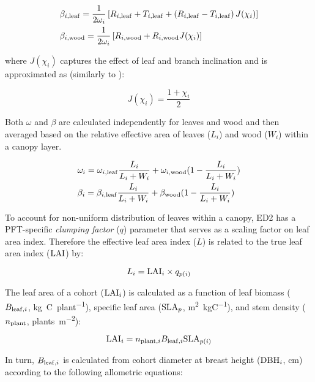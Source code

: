 \begin{align}
  & \beta_{i, \mathrm{leaf}} = \frac{1}{2 \omega_{i}} \left[R_{i, \mathrm{leaf}} + T_{i, \mathrm{leaf}} + \left( R_{i, \mathrm{leaf}} - T_{i, \mathrm{leaf}} \right) J(\chi_{i}) \right] \\
  & \beta_{i, \mathrm{wood}} = \frac{1}{2 \omega_{i}} \left[R_{i, \mathrm{wood}} +  R_{i, \mathrm{wood}} J(\chi_{i}) \right]
\end{align}

where $J(\chi_{i})$ captures the effect of leaf and branch inclination and is approximated as (similarly to \citealt{clm45_note}):

\begin{equation}
  J(\chi_{i}) = \frac{1 + \chi_{i}}{2}
\end{equation}

Both $\omega$ and $\beta$ are calculated independently for leaves and wood and then averaged based on the relative effective area of leaves ($L_{i}$) and wood ($W_{i}$) within a canopy layer.

\begin{align}
  & \omega_{i} = \omega_{i, \mathrm{leaf}} \frac{L_{i}}{L_{i} + W_{i}} + \omega_{i, \mathrm{wood}} (1 - \frac{L_{i}}{L_{i} + W_{i}}) \\
  & \beta_{i} = \beta_{i, \mathrm{leaf}} \frac{L_{i}}{L_{i} + W_{i}} + \beta_{\mathrm{wood}} (1 - \frac{L_{i}}{L_{i} + W_{i}})
\end{align}

To account for non-uniform distribution of leaves within a canopy, ED2 has a PFT-specific \emph{clumping factor} ($q$) parameter that serves as a scaling factor on leaf area index.
Therefore the effective leaf area index ($L$) is related to the true leaf area index ($\mathrm{LAI}$) by:

\begin{equation}
  \label{eqn:elai}
  L_{i} = \mathrm{LAI}_{i} \times q_{p(i)}
\end{equation}

The leaf area of a cohort ($\mathrm{LAI}_{i}$) is calculated as a function of leaf biomass ($B_{\mathrm{leaf}, i}$, \unit{kg C ~ plant^{-1}}), specific leaf area ($\mathrm{SLA}_{p}$, \unit{m^2 ~ kgC^{-1}}), and stem density ($n_{\mathrm{plant}}$, \unit{plants ~ m^{-2}}):

\begin{equation}
  \mathrm{LAI}_{i} = n_{\mathrm{plant}, i} B_{\mathrm{leaf}, i} \mathrm{SLA}_{p(i)}
\end{equation}

In turn, $B_{\mathrm{leaf}, i}$ is calculated from cohort diameter at breast height ($\mathrm{DBH}_{i}$, \unit{cm}) according to the following allometric equations:

